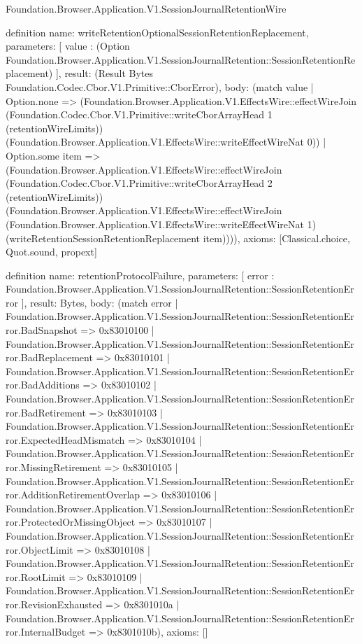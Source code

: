 \begin{lexlean}{Foundation.Browser.Application.V1.SessionJournalRetentionWire}
\begin{semanticmodule}
definition{
  name: writeRetentionOptionalSessionRetentionReplacement,
  parameters: [
    value : (Option Foundation.Browser.Application.V1.SessionJournalRetention::SessionRetentionReplacement)
  ],
  result: (Result Bytes Foundation.Codec.Cbor.V1.Primitive::CborError),
  body: (match value
    | Option.none => (Foundation.Browser.Application.V1.EffectsWire::effectWireJoin (Foundation.Codec.Cbor.V1.Primitive::writeCborArrayHead 1 (retentionWireLimits)) (Foundation.Browser.Application.V1.EffectsWire::writeEffectWireNat 0))
    | Option.some item => (Foundation.Browser.Application.V1.EffectsWire::effectWireJoin (Foundation.Codec.Cbor.V1.Primitive::writeCborArrayHead 2 (retentionWireLimits)) (Foundation.Browser.Application.V1.EffectsWire::effectWireJoin (Foundation.Browser.Application.V1.EffectsWire::writeEffectWireNat 1) (writeRetentionSessionRetentionReplacement item)))),
  axioms: [Classical.choice, Quot.sound, propext]
}

definition{
  name: retentionProtocolFailure,
  parameters: [
    error : Foundation.Browser.Application.V1.SessionJournalRetention::SessionRetentionError
  ],
  result: Bytes,
  body: (match error
    | Foundation.Browser.Application.V1.SessionJournalRetention::SessionRetentionError.BadSnapshot => 0x83010100
    | Foundation.Browser.Application.V1.SessionJournalRetention::SessionRetentionError.BadReplacement => 0x83010101
    | Foundation.Browser.Application.V1.SessionJournalRetention::SessionRetentionError.BadAdditions => 0x83010102
    | Foundation.Browser.Application.V1.SessionJournalRetention::SessionRetentionError.BadRetirement => 0x83010103
    | Foundation.Browser.Application.V1.SessionJournalRetention::SessionRetentionError.ExpectedHeadMismatch => 0x83010104
    | Foundation.Browser.Application.V1.SessionJournalRetention::SessionRetentionError.MissingRetirement => 0x83010105
    | Foundation.Browser.Application.V1.SessionJournalRetention::SessionRetentionError.AdditionRetirementOverlap => 0x83010106
    | Foundation.Browser.Application.V1.SessionJournalRetention::SessionRetentionError.ProtectedOrMissingObject => 0x83010107
    | Foundation.Browser.Application.V1.SessionJournalRetention::SessionRetentionError.ObjectLimit => 0x83010108
    | Foundation.Browser.Application.V1.SessionJournalRetention::SessionRetentionError.RootLimit => 0x83010109
    | Foundation.Browser.Application.V1.SessionJournalRetention::SessionRetentionError.RevisionExhausted => 0x8301010a
    | Foundation.Browser.Application.V1.SessionJournalRetention::SessionRetentionError.InternalBudget => 0x8301010b),
  axioms: []
}


\end{semanticmodule}
\end{lexlean}
